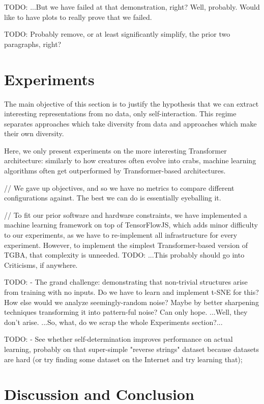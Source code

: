 \documentclass{article}
\begin{document}
    TODO: ...But we have failed at that demonstration, right? Well, probably. Would like to have plots to really prove that we failed.

    TODO: Probably remove, or at least significantly simplify, the prior two paragraphs, right?

\section{Experiments}

The main objective of this section is to justify the hypothesis that we can extract interesting representations from no data, only self-interaction. This regime separates approaches which take diversity from data and approaches which make their own diversity.

Here, we only present experiments on the more interesting Transformer architecture: similarly to how creatures often evolve into crabs, machine learning algorithms often get outperformed by Transformer-based architectures.

// We gave up objectives, and so we have no metrics to compare different configurations against. The best we can do is essentially eyeballing it.

// To fit our prior software and hardware constraints, we have implemented a machine learning framework on top of TensorFlowJS, which adds minor difficulty to our experiments, as we have to re-implement all infrastructure for every experiment. However, to implement the simplest Transformer-based version of TGBA, that complexity is unneeded. TODO: ...This probably should go into Criticisms, if anywhere.

    TODO: - The grand challenge: demonstrating that non-trivial structures arise from training with no inputs. Do we have to learn and implement t-SNE for this? How else would we analyze seemingly-random noise? Maybe by better sharpening techniques transforming it into pattern-ful noise? Can only hope. ...Well, they don't arise. ...So, what, do we scrap the whole Experiments section?...

    TODO: - See whether self-determination improves performance on actual learning, probably on that super-simple "reverse strings" dataset because datasets are hard (or try finding some dataset on the Internet and try learning that);

\section{Discussion and Conclusion}
\end{document}
